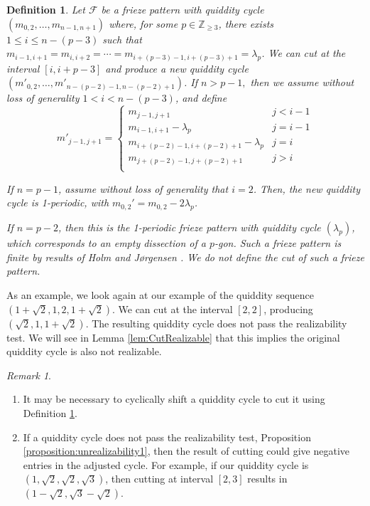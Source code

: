 \documentclass[12pt]{article}
\newtheorem{definition}{Definition}
\theoremstyle{remark}
\newtheorem{remark}{Remark}
\begin{document}
\begin{definition}\label{def:cut}
Let $\mathcal{F}$ be a frieze pattern with quiddity cycle $(m_{0,2},\ldots,m_{n-1,n+1})$ where, for some $p \in \mathbb{Z}_{\geq 3}$, there exists $1 \leq i \leq n-(p-3)$ such that $m_{i-1,i+1} = m_{i,i+2} = \cdots = m_{i+(p-3)-1,i+(p-3)+1} = \lambda_p$. We can \emph{cut} at the interval $[i,i+p-3]$ and produce a new quiddity cycle $(m'_{0,2},\ldots,m'_{n-(p-2)-1,n-(p-2)+1})$. If $n > p-1,$ then we assume without loss of generality $1 < i < n-(p-3)$, and define\[
m'_{j-1,j+1} = \begin{cases} m_{j-1,j+1} & j < i-1\\
m_{i-1,i+1} - \lambda_p & j = i-1\\
m_{i+(p-2)-1,i+(p-2) + 1} - \lambda_p & j = i\\
m_{j + (p-2) -1, j+ (p-2) + 1} & j > i \\
\end{cases}
\]

If $n = p-1$, assume without loss of generality that $i = 2$. Then, the new quiddity cycle is 1-periodic, with $m_{0,2}' = m_{0,2} - 2\lambda_p$.

If $n = p-2$, then this is the 1-periodic frieze pattern with quiddity cycle $(\lambda_p)$, which corresponds to an empty dissection of a $p$-gon. Such a frieze pattern is finite by results of Holm and J{\o}rgensen  \cite{14}. We do not define the cut of such a frieze pattern. \end{definition}

As an example, we look again at our example of the quiddity sequence $(1 + \sqrt{2},1,2,1+\sqrt{2})$. We can cut at the interval $[2,2]$, producing $(\sqrt{2},1,1+\sqrt{2})$. The resulting quiddity cycle does not pass the realizability test. We will see in Lemma \ref{lem:CutRealizable} that this implies the original quiddity cycle is also not realizable.

\begin{remark}
\begin{enumerate}
    \item It may be necessary to cyclically shift a quiddity cycle to cut it using Definition \ref{def:cut}.
    \item If a quiddity cycle does not pass the realizability test, Proposition \ref{proposition:unrealizability1}, then the result of cutting could give negative entries in the adjusted cycle. For example, if our quiddity cycle is $(1,\sqrt{2},\sqrt{2},\sqrt{3})$, then cutting at interval $[2,3]$ results in $(1-\sqrt{2},\sqrt{3}-\sqrt{2})$.
\end{enumerate}
\end{remark}
\end{document}
